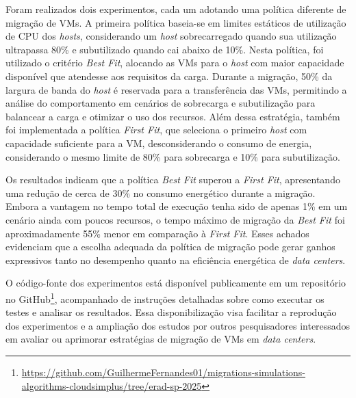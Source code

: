 \documentclass[12pt]{article}
\begin{document}
Foram realizados dois experimentos, cada um adotando uma política diferente de migração de VMs. A primeira política baseia-se em limites estáticos de utilização de CPU dos \textit{hosts}, considerando um \textit{host} sobrecarregado quando sua utilização ultrapassa 80\% e subutilizado quando cai abaixo de 10\%. Nesta política, foi utilizado o critério \textit{Best Fit}, alocando as VMs para o \textit{host} com maior capacidade disponível que atendesse aos requisitos da carga. Durante a migração, 50\% da largura de banda do \textit{host} é reservada para a transferência das VMs, permitindo a análise do comportamento em cenários de sobrecarga e subutilização para balancear a carga e otimizar o uso dos recursos. Além dessa estratégia, também foi implementada a política \textit{First Fit}, que seleciona o primeiro \textit{host} com capacidade suficiente para a VM, desconsiderando o consumo de energia, considerando o mesmo limite de 80\% para sobrecarga e 10\% para subutilização.

Os resultados indicam que a política \textit{Best Fit} superou a \textit{First Fit}, apresentando uma redução de cerca de 30\% no consumo energético durante a migração. Embora a vantagem no tempo total de execução tenha sido de apenas 1\% em um cenário ainda com poucos recursos, o tempo máximo de migração da \textit{Best Fit} foi aproximadamente 55\% menor em comparação à \textit{First Fit}. Esses achados evidenciam que a escolha adequada da política de migração pode gerar ganhos expressivos tanto no desempenho quanto na eficiência energética de \textit{data centers}.

O código-fonte dos experimentos está disponível publicamente em um repositório no GitHub\footnote{\url{https://github.com/GuilhermeFernandes01/migrations-simulations-algorithms-cloudsimplus/tree/erad-sp-2025}}, acompanhado de instruções detalhadas sobre como executar os testes e analisar os resultados. Essa disponibilização visa facilitar a reprodução dos experimentos e a ampliação dos estudos por outros pesquisadores interessados em avaliar ou aprimorar estratégias de migração de VMs em \textit{data centers}.
\end{document}
